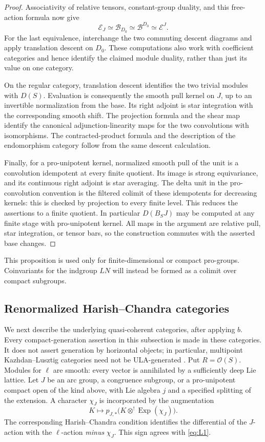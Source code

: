 \documentclass[11pt]{article}
\numberwithin{equation}{section}
\theoremstyle{definition}
\theoremstyle{remark}
\begin{document}
\begin{proof}
Associativity of relative tensors, constant-group duality, and this
free-action formula now give
\[
        \mathcal E_J\simeq\mathcal B_{D_0}
                    \simeq\mathcal B^{D_0}
                    \simeq\mathcal E^J.
\]
For the last equivalence, interchange the two commuting descent
diagrams and apply translation descent on $D_0$.  These computations
also work with coefficient categories and hence identify the claimed
module duality, rather than just its value on one category.

On the regular category, translation descent identifies the two
trivial modules with $D(S)$.  Evaluation is consequently the smooth
pull kernel on $J$, up to an invertible normalization from the base.
Its right adjoint is star integration with the corresponding smooth
shift.  The projection formula and the shear map identify the
canonical adjunction-linearity maps for the two convolutions with
isomorphisms.  The contracted-product formula and the description of
the endomorphism category follow from the same descent calculation.

Finally, for a pro-unipotent kernel, normalized smooth pull of the
unit is a convolution idempotent at every finite quotient.  Its image
is strong equivariance, and its continuous right adjoint is star
averaging.  The delta unit in the pro-convolution convention is the
filtered colimit of these idempotents for decreasing kernels: this
is checked by projection to every finite level.  This reduces the
assertions to a finite quotient.  In particular $D(B_SJ)$ may be
computed at any finite stage with pro-unipotent kernel.  All maps in
the argument are relative pull, star integration, or tensor bars,
so the construction commutes with the asserted base changes.
\end{proof}

This proposition is used only for finite-dimensional or compact
pro-groups.  Coinvariants for the indgroup $LN$ will instead be formed
as a colimit over compact subgroups.

\subsection{Renormalized Harish--Chandra categories}

We next describe the underlying quasi-coherent categories, after applying
$b$.  Every compact-generation assertion in this subsection is made
in these categories.  It does not assert generation by horizontal
objects; in particular, multipoint Kazhdan--Lusztig categories need
not be ULA-generated \cite[Remark~B.14.25]{GLCII}.  Put
$R=\mathcal O(S)$.  Modules for $\ell$ are smooth: every vector is
annihilated by a sufficiently deep Lie lattice.  Let $J$ be an arc
group, a congruence subgroup, or a pro-unipotent compact open of the
kind above, with Lie algebra $j$ and a specified splitting of the
extension.  A character $\chi_J$ is incorporated by the augmentation
\[
       K\longmapsto p_{J,*}
                      \bigl(K\otimes^!\operatorname{Exp}(\chi_J)\bigr).
\]
The corresponding Harish--Chandra condition identifies the differential
of the $J$-action with the $\ell$-action \emph{minus} $\chi_J$.
This sign agrees with \eqref{eq:L1}.
\end{document}
